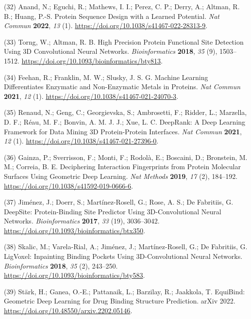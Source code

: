 \documentclass[ lineno,
  9pt]{elife}
\newenvironment{cslreferences}%
  {}%
  {\par}
\begin{document}
\begin{cslreferences}
\leavevmode\hypertarget{ref-6szq3cwi}{}%
(32) Anand, N.; Eguchi, R.; Mathews, I. I.; Perez, C. P.; Derry, A.; Altman, R. B.; Huang, P.-S. Protein Sequence Design with a Learned Potential. \emph{Nat Commun} \textbf{2022}, \emph{13} (1). \url{https://doi.org/10.1038/s41467-022-28313-9}.

\leavevmode\hypertarget{ref-SGggOw7Z}{}%
(33) Torng, W.; Altman, R. B. High Precision Protein Functional Site Detection Using 3D Convolutional Neural Networks. \emph{Bioinformatics} \textbf{2018}, \emph{35} (9), 1503--1512. \url{https://doi.org/10.1093/bioinformatics/bty813}.

\leavevmode\hypertarget{ref-MKP16DSu}{}%
(34) Feehan, R.; Franklin, M. W.; Slusky, J. S. G. Machine Learning Differentiates Enzymatic and Non-Enzymatic Metals in Proteins. \emph{Nat Commun} \textbf{2021}, \emph{12} (1). \url{https://doi.org/10.1038/s41467-021-24070-3}.

\leavevmode\hypertarget{ref-q224Kv8w}{}%
(35) Renaud, N.; Geng, C.; Georgievska, S.; Ambrosetti, F.; Ridder, L.; Marzella, D. F.; Réau, M. F.; Bonvin, A. M. J. J.; Xue, L. C. DeepRank: A Deep Learning Framework for Data Mining 3D Protein-Protein Interfaces. \emph{Nat Commun} \textbf{2021}, \emph{12} (1). \url{https://doi.org/10.1038/s41467-021-27396-0}.

\leavevmode\hypertarget{ref-yBhqGkBa}{}%
(36) Gainza, P.; Sverrisson, F.; Monti, F.; Rodolà, E.; Boscaini, D.; Bronstein, M. M.; Correia, B. E. Deciphering Interaction Fingerprints from Protein Molecular Surfaces Using Geometric Deep Learning. \emph{Nat Methods} \textbf{2019}, \emph{17} (2), 184--192. \url{https://doi.org/10.1038/s41592-019-0666-6}.

\leavevmode\hypertarget{ref-Gq7n6vhH}{}%
(37) Jiménez, J.; Doerr, S.; Martínez-Rosell, G.; Rose, A. S.; De Fabritiis, G. DeepSite: Protein-Binding Site Predictor Using 3D-Convolutional Neural Networks. \emph{Bioinformatics} \textbf{2017}, \emph{33} (19), 3036--3042. \url{https://doi.org/10.1093/bioinformatics/btx350}.

\leavevmode\hypertarget{ref-mVGaXlum}{}%
(38) Skalic, M.; Varela-Rial, A.; Jiménez, J.; Martínez-Rosell, G.; De Fabritiis, G. LigVoxel: Inpainting Binding Pockets Using 3D-Convolutional Neural Networks. \emph{Bioinformatics} \textbf{2018}, \emph{35} (2), 243--250. \url{https://doi.org/10.1093/bioinformatics/bty583}.

\leavevmode\hypertarget{ref-13hjzBbje}{}%
(39) Stärk, H.; Ganea, O.-E.; Pattanaik, L.; Barzilay, R.; Jaakkola, T. EquiBind: Geometric Deep Learning for Drug Binding Structure Prediction. arXiv 2022. \url{https://doi.org/10.48550/arxiv.2202.05146}.


\end{cslreferences}
\end{document}
